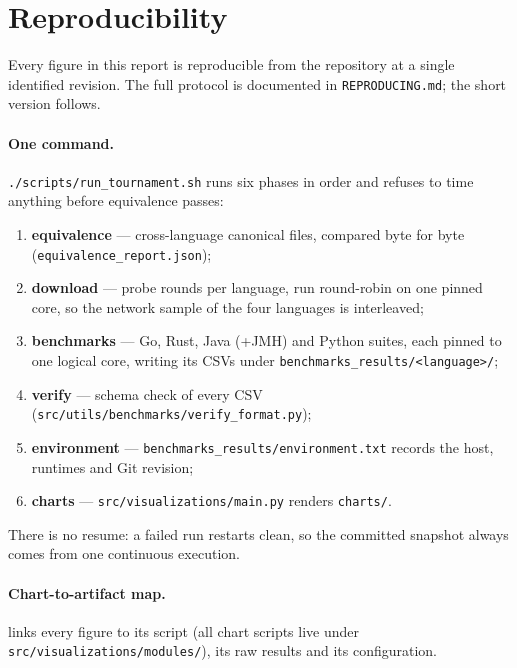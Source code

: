 \section{Reproducibility}
\label{sec:reproducibility}

Every figure in this report is reproducible from the repository at a single
identified revision. The full protocol is documented in
\texttt{REPRODUCING.md}; the short version follows.

\paragraph{One command.}
\texttt{./scripts/run\_tournament.sh} runs six phases in order and refuses
to time anything before equivalence passes:

\begin{enumerate}
    \item \textbf{equivalence} --- cross-language canonical files, compared
    byte for byte (\texttt{equivalence\_\allowbreak report.json});
    \item \textbf{download} ---  probe rounds per language, run
    round-robin on one pinned core, so the network sample of the four
    languages is interleaved;
    \item \textbf{benchmarks} --- Go, Rust, Java (+JMH) and Python suites,
    each pinned to one logical core, writing its CSVs under
    \texttt{benchmarks\_\allowbreak results/\allowbreak <language>/};
    \item \textbf{verify} --- schema check of every CSV
    (\texttt{src/\allowbreak utils/\allowbreak benchmarks/\allowbreak verify\_\allowbreak format.py});
    \item \textbf{environment} --- \texttt{benchmarks\_\allowbreak results/\allowbreak environment.txt}
    records the host, runtimes and Git revision;
    \item \textbf{charts} --- \texttt{src/\allowbreak visualizations/\allowbreak main.py} renders \texttt{charts/}.
\end{enumerate}

There is no resume: a failed run restarts clean, so the committed snapshot
always comes from one continuous execution.

\paragraph{Chart-to-artifact map.}
 links every figure to its script (all chart scripts
live under \texttt{src/\allowbreak visualizations/\allowbreak modules/}), its raw results and its
configuration.

